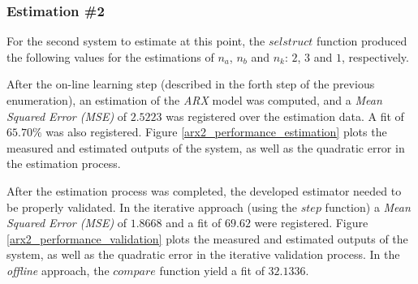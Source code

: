 \documentclass[12pt]{article}
\begin{document}
\subsubsection{Estimation \#2}
\label{estimation2}

For the second system to estimate at this point, the $selstruct$ function produced the following values for the estimations of $n_{a}$, $n_{b}$ and $n_{k}$: $2$, $3$ and $1$, respectively.

After the on-line learning step (described in the forth step of the previous enumeration), an estimation of the \emph{ARX} model was computed, and a \emph{Mean Squared Error (MSE)} of $2.5223$ was registered over the estimation data. A fit of $65.70\%$ was also registered. Figure \ref{arx2_performance_estimation} plots the measured and estimated outputs of the system, as well as the quadratic error in the estimation process.

After the estimation process was completed, the developed estimator needed to be properly validated. In the iterative approach (using the $step$ function) a \emph{Mean Squared Error (MSE)} of $1.8668$ and a fit of $69.62$ were registered. Figure \ref{arx2_performance_validation} plots the measured and estimated outputs of the system, as well as the quadratic error in the iterative validation process. In the \emph{offline} approach, the $compare$ function yield a fit of $32.1336$.
\end{document}
